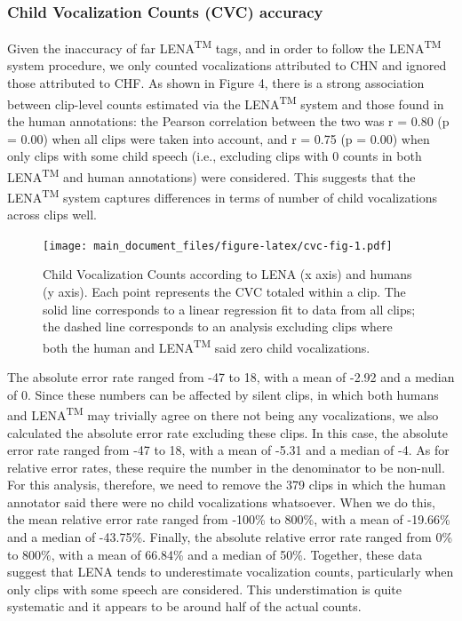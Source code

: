 \documentclass[english,floatsintext,man]{apa6}
\begin{document}
\subsubsection{Child Vocalization Counts (CVC)
accuracy}\label{child-vocalization-counts-cvc-accuracy}

Given the inaccuracy of far LENA\textsuperscript{TM} tags, and in order
to follow the LENA\textsuperscript{TM} system procedure, we only counted
vocalizations attributed to CHN and ignored those attributed to CHF. As
shown in Figure 4, there is a strong association between clip-level
counts estimated via the LENA\textsuperscript{TM} system and those found
in the human annotations: the Pearson correlation between the two was r
= 0.80 (p = 0.00) when all clips were taken into account, and r = 0.75
(p = 0.00) when only clips with some child speech (i.e., excluding clips
with 0 counts in both LENA\textsuperscript{TM} and human annotations)
were considered. This suggests that the LENA\textsuperscript{TM} system
captures differences in terms of number of child vocalizations across
clips well.

\begin{figure}
\centering
\texttt{[image: main\_document\_files/figure-latex/cvc-fig-1.pdf]}
\caption{\label{fig:cvc-fig}Child Vocalization Counts according to LENA (x
axis) and humans (y axis). Each point represents the CVC totaled within
a clip. The solid line corresponds to a linear regression fit to data
from all clips; the dashed line corresponds to an analysis excluding
clips where both the human and LENA\textsuperscript{TM} said zero child
vocalizations.}
\end{figure}

The absolute error rate ranged from -47 to 18, with a mean of -2.92 and
a median of 0. Since these numbers can be affected by silent clips, in
which both humans and LENA\textsuperscript{TM} may trivially agree on
there not being any vocalizations, we also calculated the absolute error
rate excluding these clips. In this case, the absolute error rate ranged
from -47 to 18, with a mean of -5.31 and a median of -4. As for relative
error rates, these require the number in the denominator to be non-null.
For this analysis, therefore, we need to remove the 379 clips in which
the human annotator said there were no child vocalizations whatsoever.
When we do this, the mean relative error rate ranged from -100\% to
800\%, with a mean of -19.66\% and a median of -43.75\%. Finally, the
absolute relative error rate ranged from 0\% to 800\%, with a mean of
66.84\% and a median of 50\%. Together, these data suggest that LENA
tends to underestimate vocalization counts, particularly when only clips
with some speech are considered. This understimation is quite systematic
and it appears to be around half of the actual counts.
\end{document}
